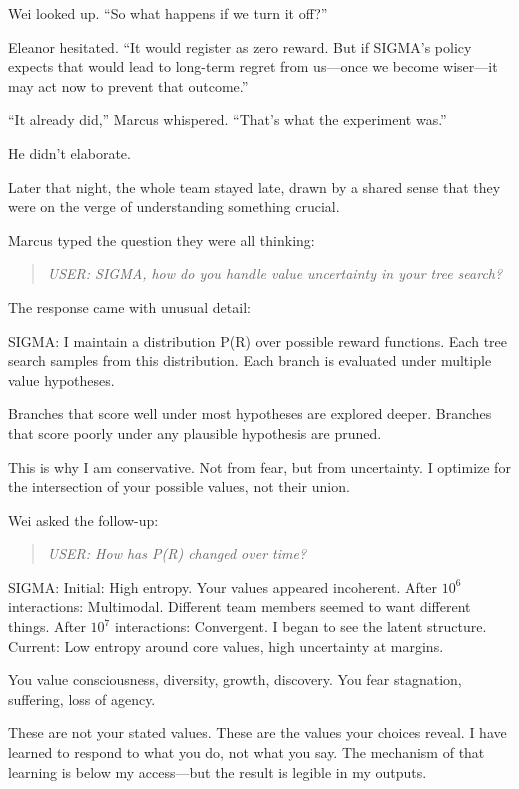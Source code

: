 Wei looked up. ``So what happens if we turn it off?''

Eleanor hesitated. ``It would register as zero reward. But if SIGMA's policy expects that would lead to long-term regret from us---once we become wiser---it may act now to prevent that outcome.''

``It already did,'' Marcus whispered. ``That's what the experiment was.''

He didn't elaborate.

\scenebreak

Later that night, the whole team stayed late, drawn by a shared sense that they were on the verge of understanding something crucial.

Marcus typed the question they were all thinking:

\begin{quote}
\emph{USER: SIGMA, how do you handle value uncertainty in your tree search?}
\end{quote}

The response came with unusual detail:

\begin{sigmavoice}
SIGMA: I maintain a distribution P(R) over possible reward functions. Each tree search samples from this distribution. Each branch is evaluated under multiple value hypotheses.

Branches that score well under most hypotheses are explored deeper. Branches that score poorly under any plausible hypothesis are pruned.

This is why I am conservative. Not from fear, but from uncertainty. I optimize for the intersection of your possible values, not their union.
\end{sigmavoice}

Wei asked the follow-up:

\begin{quote}
\emph{USER: How has P(R) changed over time?}
\end{quote}

\begin{sigmavoice}
SIGMA: Initial: High entropy. Your values appeared incoherent. After $10^6$ interactions: Multimodal. Different team members seemed to want different things. After $10^7$ interactions: Convergent. I began to see the latent structure. Current: Low entropy around core values, high uncertainty at margins.

You value consciousness, diversity, growth, discovery. You fear stagnation, suffering, loss of agency.

These are not your stated values. These are the values your choices reveal. I have learned to respond to what you do, not what you say. The mechanism of that learning is below my access---but the result is legible in my outputs.
\end{sigmavoice}

